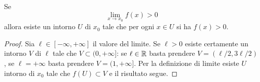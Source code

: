 \begin{theorem}%
\mymark{***}%
%
%
%
Se
\[
  \lim_{x\to x_0} f(x) > 0
\]
allora esiste un intorno $U$ di $x_0$ tale che 
per ogni $x\in U$ si ha $f(x) > 0$.
\end{theorem}
%
\begin{proof}
Sia $\ell\in [-\infty,+\infty]$ il valore del limite.
Se $\ell>0$ esiste certamente un intorno $V$ di $\ell$ 
tale che $V\subset (0,+\infty]$: se $\ell\in {\mathbb R}$ basta prendere 
$V=(\ell/2,3 \ell/2)$, se $\ell=+\infty$ basta prendere $V=(1,+\infty]$.
Per la definizione di limite esiste $U$ intorno di $x_0$ 
tale che $f(U)\subset V$ e il risultato segue.
\end{proof}

